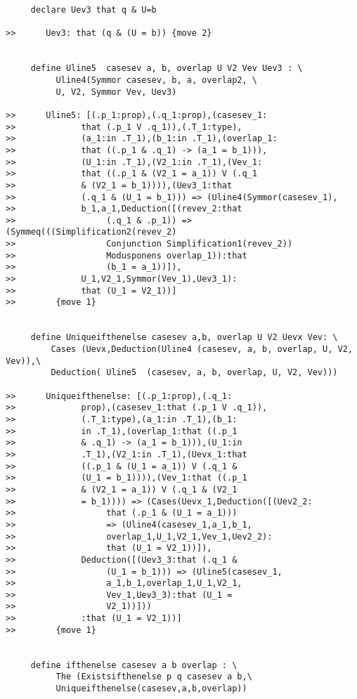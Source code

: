 \documentclass[12pt]{article}
\begin{document}
\begin{verbatim}
     declare Uev3 that q & U=b

>>      Uev3: that (q & (U = b)) {move 2}


     define Uline5  casesev a, b, overlap U V2 Vev Uev3 : \
          Uline4(Symmor casesev, b, a, overlap2, \
          U, V2, Symmor Vev, Uev3)

>>      Uline5: [(.p_1:prop),(.q_1:prop),(casesev_1:
>>             that (.p_1 V .q_1)),(.T_1:type),
>>             (a_1:in .T_1),(b_1:in .T_1),(overlap_1:
>>             that ((.p_1 & .q_1) -> (a_1 = b_1))),
>>             (U_1:in .T_1),(V2_1:in .T_1),(Vev_1:
>>             that ((.p_1 & (V2_1 = a_1)) V (.q_1 
>>             & (V2_1 = b_1)))),(Uev3_1:that 
>>             (.q_1 & (U_1 = b_1))) => (Uline4(Symmor(casesev_1),
>>             b_1,a_1,Deduction([(revev_2:that 
>>                  (.q_1 & .p_1)) => (Symmeq(((Simplification2(revev_2) 
>>                  Conjunction Simplification1(revev_2)) 
>>                  Modusponens overlap_1)):that 
>>                  (b_1 = a_1))]),
>>             U_1,V2_1,Symmor(Vev_1),Uev3_1):
>>             that (U_1 = V2_1))]
>>        {move 1}


     define Uniqueifthenelse casesev a,b, overlap U V2 Uevx Vev: \
         Cases (Uevx,Deduction(Uline4 (casesev, a, b, overlap, U, V2, Vev)),\
         Deduction( Uline5  (casesev, a, b, overlap, U, V2, Vev)))

>>      Uniqueifthenelse: [(.p_1:prop),(.q_1:
>>             prop),(casesev_1:that (.p_1 V .q_1)),
>>             (.T_1:type),(a_1:in .T_1),(b_1:
>>             in .T_1),(overlap_1:that ((.p_1 
>>             & .q_1) -> (a_1 = b_1))),(U_1:in 
>>             .T_1),(V2_1:in .T_1),(Uevx_1:that 
>>             ((.p_1 & (U_1 = a_1)) V (.q_1 & 
>>             (U_1 = b_1)))),(Vev_1:that ((.p_1 
>>             & (V2_1 = a_1)) V (.q_1 & (V2_1 
>>             = b_1)))) => (Cases(Uevx_1,Deduction([(Uev2_2:
>>                  that (.p_1 & (U_1 = a_1))) 
>>                  => (Uline4(casesev_1,a_1,b_1,
>>                  overlap_1,U_1,V2_1,Vev_1,Uev2_2):
>>                  that (U_1 = V2_1))]),
>>             Deduction([(Uev3_3:that (.q_1 & 
>>                  (U_1 = b_1))) => (Uline5(casesev_1,
>>                  a_1,b_1,overlap_1,U_1,V2_1,
>>                  Vev_1,Uev3_3):that (U_1 = 
>>                  V2_1))]))
>>             :that (U_1 = V2_1))]
>>        {move 1}


     define ifthenelse casesev a b overlap : \
          The (Existsifthenelse p q casesev a b,\
          Uniqueifthenelse(casesev,a,b,overlap))


\end{verbatim}
\end{document}
